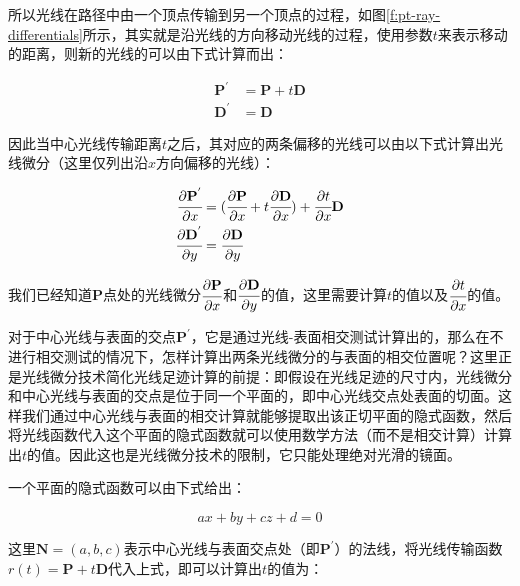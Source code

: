 所以光线在路径中由一个顶点传输到另一个顶点的过程，如图\ref{f:pt-ray-differentials}所示，其实就是沿光线的方向移动光线的过程，使用参数$t$来表示移动的距离，则新的光线的可以由下式计算而出：

\begin{equation}
\begin{aligned}
	\mathbf{P}^{'}&=\mathbf{P}+t\mathbf{D}\\
	\mathbf{D}^{'}&=\mathbf{D}
\end{aligned}
\end{equation}

因此当中心光线传输距离$t$之后，其对应的两条偏移的光线可以由以下式计算出光线微分（这里仅列出沿$x$方向偏移的光线）：

\begin{equation}\label{e:pt-ray-transfer}
	\begin{aligned}
		 \cfrac{{\rm \partial}\mathbf{P}^{'}}{{\rm \partial} x}&=( \cfrac{{\rm \partial}\mathbf{P}}{{\rm \partial} x} +t \cfrac{{\rm \partial}\mathbf{D}}{{\rm \partial} x})+ \cfrac{{\rm \partial} t}{{\rm \partial} x}\mathbf{D} \\
		 \cfrac{{\rm \partial}\mathbf{D}^{'}}{{\rm \partial} y}&=  \cfrac{{\rm \partial}\mathbf{D}}{{\rm \partial} y}
	\end{aligned}
\end{equation}

我们已经知道$\mathbf{P}$点处的光线微分$ \cfrac{{\rm \partial}\mathbf{P}}{{\rm \partial} x}$和$ \cfrac{{\rm \partial}\mathbf{D}}{{\rm \partial} y}$的值，这里需要计算$t$的值以及$ \cfrac{{\rm \partial} t}{{\rm \partial} x}$的值。

对于中心光线与表面的交点$\mathbf{P}^{'}$，它是通过光线-表面相交测试计算出的，那么在不进行相交测试的情况下，怎样计算出两条光线微分的与表面的相交位置呢？这里正是光线微分技术简化光线足迹计算的前提：即假设在光线足迹的尺寸内，光线微分和中心光线与表面的交点是位于同一个平面的，即中心光线交点处表面的切面。这样我们通过中心光线与表面的相交计算就能够提取出该正切平面的隐式函数，然后将光线函数代入这个平面的隐式函数就可以使用数学方法（而不是相交计算）计算出$t$的值。因此这也是光线微分技术的限制，它只能处理绝对光滑的镜面。

一个平面的隐式函数可以由下式给出：

\begin{equation}
	ax+by+cz+d=0
\end{equation}

\noindent 这里$\mathbf{N}=(a,b,c)$表示中心光线与表面交点处（即$\mathbf{P}^{'}$）的法线，将光线传输函数$r(t)=\mathbf{P}+t\mathbf{D}$代入上式，即可以计算出$t$的值为：

